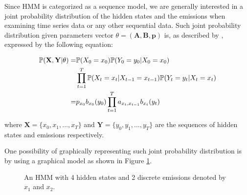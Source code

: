 Since HMM is categorized as a sequence model, we are generally interested in a joint probability distribution of the hidden states and the emissions when examining 
time series data or any other sequential data. Such joint probability distribution given parameters vector $\theta = (\textbf{A},\textbf{B},\textbf{p})$ is, as described by \citep{Rabiner1989}, 
expressed by the following equation:

\begin{align}
    \mathbb{P}(\textbf{X}, \textbf{Y}| \theta) = & \mathbb{P}(X_0 = x_0) \mathbb{P}(Y_0 = y_0|X_0 = x_0) \notag \\ 
                                                 & \prod_{t=1}^T \mathbb{P}(X_t = x_t|X_{t-1} = x_{t-1}) \mathbb{P}(Y_t = y_t|X_t = x_t) \\
                                               = & p_{x_0} b_{x_0}(y_0) \prod_{t=1}^T a_{x_t,x_{t-1}} b_{x_t}(y_t)
\end{align}

\noindent where $\textbf{X} = \{x_0,x_1,\ldots,x_T\}$ and $\textbf{Y} = \{y_0,y_1,\ldots,y_T\}$ are the sequences of hidden states and emissions respectively. 

One possibility of graphically representing such joint probability distribution is by using a graphical 
model as shown in Figure \ref{fig:HMM}. 

\begin{figure}[htbp]
\begin{center}
\end{center}
\caption[Left-to-right state and emission dependence in Hidden Markov Model]{An HMM with 4 hidden states and 2 discrete emissions denoted by $x_1$ and $x_2$.}
\label{fig:HMM}
\end{figure}

